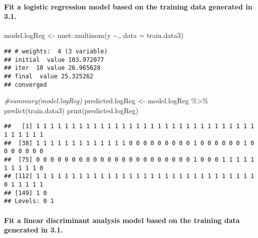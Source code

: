 \documentclass[
]{article}
\newenvironment{Shaded}{\begin{snugshade}}{\end{snugshade}}
\newcommand{\AttributeTok}[1]{\textcolor[rgb]{0.77,0.63,0.00}{#1}}
\newcommand{\CommentTok}[1]{\textcolor[rgb]{0.56,0.35,0.01}{\textit{#1}}}
\newcommand{\FunctionTok}[1]{\textcolor[rgb]{0.00,0.00,0.00}{#1}}
\newcommand{\NormalTok}[1]{#1}
\newcommand{\OtherTok}[1]{\textcolor[rgb]{0.56,0.35,0.01}{#1}}
\newcommand{\SpecialCharTok}[1]{\textcolor[rgb]{0.00,0.00,0.00}{#1}}
\begin{document}
\hypertarget{fit-a-logistic-regression-model-based-on-the-training-data-generated-in-3.1.}{%
\paragraph{Fit a logistic regression model based on the training data
generated in
3.1.}\label{fit-a-logistic-regression-model-based-on-the-training-data-generated-in-3.1.}}

\begin{Shaded}
\begin{Highlighting}[]
\NormalTok{model.logReg }\OtherTok{\textless{}{-}}\NormalTok{ nnet}\SpecialCharTok{::}\FunctionTok{multinom}\NormalTok{(y }\SpecialCharTok{\textasciitilde{}}\NormalTok{., }\AttributeTok{data =}\NormalTok{ train.data3)}
\end{Highlighting}
\end{Shaded}

\begin{verbatim}
## # weights:  4 (3 variable)
## initial  value 103.972077 
## iter  10 value 26.965628
## final  value 25.325262 
## converged
\end{verbatim}

\begin{Shaded}
\begin{Highlighting}[]
\CommentTok{\#summary(model.logReg)}
\NormalTok{predicted.logReg }\OtherTok{\textless{}{-}}\NormalTok{ model.logReg }\SpecialCharTok{\%\textgreater{}\%} \FunctionTok{predict}\NormalTok{(train.data3)}
\FunctionTok{print}\NormalTok{(predicted.logReg)}
\end{Highlighting}
\end{Shaded}

\begin{verbatim}
##   [1] 1 1 1 1 1 1 1 1 1 1 1 1 1 1 1 1 1 1 1 1 1 1 1 1 1 1 1 1 1 1 1 1 1 1 1 1 1
##  [38] 1 1 1 1 1 1 1 1 1 1 1 1 1 0 0 0 0 0 0 0 0 0 1 0 0 0 0 0 0 1 0 0 0 0 0 0 0
##  [75] 0 0 0 0 0 0 0 0 0 0 0 0 0 0 0 0 0 0 0 0 0 0 1 0 0 0 1 1 1 1 1 1 1 1 1 1 0
## [112] 1 1 1 1 1 1 1 1 1 1 1 1 1 1 1 1 1 1 1 1 1 1 1 1 1 1 1 1 1 1 1 0 1 1 1 1 1
## [149] 1 0
## Levels: 0 1
\end{verbatim}

\hypertarget{fit-a-linear-discriminant-analysis-model-based-on-the-training-data-generated-in-3.1.}{%
\paragraph{Fit a linear discriminant analysis model based on the
training data generated in
3.1.}\label{fit-a-linear-discriminant-analysis-model-based-on-the-training-data-generated-in-3.1.}}
\end{document}
